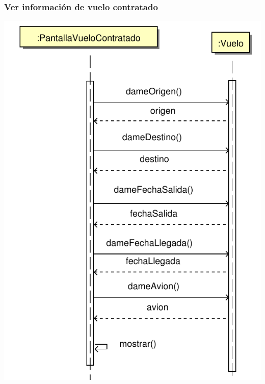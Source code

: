 \documentclass[11pt, a4paper, twoside, titlepage]{article}
\begin{document}
			\subsubsection{Ver información de vuelo contratado}
				\begin{center}
					\includegraphics[scale=.7]{diseno/diagramas/verinfovuelocontratado.pdf}
				\end{center}
			
\end{document}
